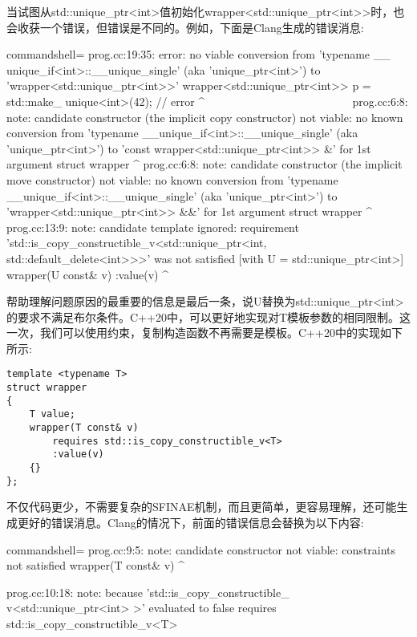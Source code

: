 当试图从std::unique\_ptr<int>值初始化wrapper<std::unique\_ptr<int>{}>时，也会收获一个错误，但错误是不同的。例如，下面是Clang生成的错误消息:

\begin{tcblisting}{commandshell={}}
prog.cc:19:35: error: no viable conversion from 'typename __
unique_if<int>::__unique_single' (aka 'unique_ptr<int>') to
   'wrapper<std::unique_ptr<int>>'
wrapper<std::unique_ptr<int>> p = std::make_
unique<int>(42); // error
                                        ^ ~~~~~~~~~~~~~~~~~~~~~~~~~
prog.cc:6:8: note: candidate constructor (the implicit copy
constructor) not viable: no known conversion from 'typename
__unique_if<int>::__unique_single' (aka 'unique_ptr<int>') to
'const wrapper<std::unique_ptr<int>> &' for 1st argument
struct wrapper
         ^
prog.cc:6:8: note: candidate constructor (the implicit move
constructor) not viable: no known conversion from 'typename
__unique_if<int>::__unique_single' (aka 'unique_ptr<int>') to
'wrapper<std::unique_ptr<int>> &&' for 1st argument
struct wrapper
         ^
prog.cc:13:9: note: candidate template ignored: requirement
'std::is_copy_constructible_v<std::unique_ptr<int,
std::default_delete<int>>>' was not satisfied [with U =
std::unique_ptr<int>]
        wrapper(U const& v) :value(v) {}
        ^
\end{tcblisting}

帮助理解问题原因的最重要的信息是最后一条，说U替换为std::unique\_ptr<int>的要求不满足布尔条件。C++20中，可以更好地实现对T模板参数的相同限制。这一次，我们可以使用约束，复制构造函数不再需要是模板。C++20中的实现如下所示:

\begin{lstlisting}[style=styleCXX]
template <typename T>
struct wrapper
{
	T value;
	wrapper(T const& v)
		requires std::is_copy_constructible_v<T>
		:value(v)
	{}
};
\end{lstlisting}

不仅代码更少，不需要复杂的SFINAE机制，而且更简单，更容易理解，还可能生成更好的错误消息。Clang的情况下，前面的错误信息会替换为以下内容:

\begin{tcblisting}{commandshell={}}
prog.cc:9:5: note: candidate constructor not viable:
constraints not satisfied
    wrapper(T const& v)
    ^

prog.cc:10:18: note: because 'std::is_copy_constructible_
v<std::unique_ptr<int> >' evaluated to false
        requires std::is_copy_constructible_v<T>
\end{tcblisting}

